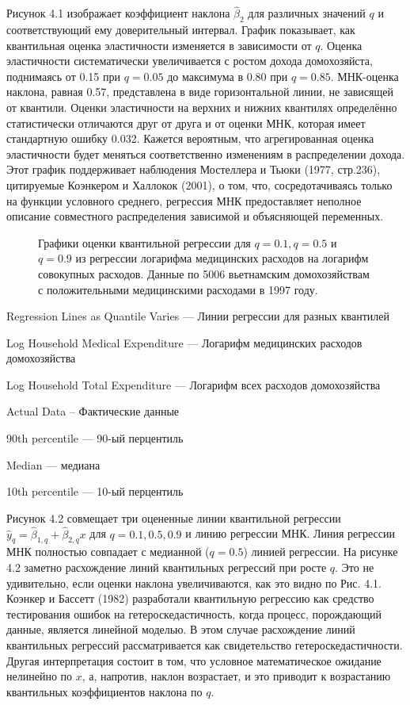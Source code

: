 Рисунок 4.1 изображает коэффициент наклона $\hat{\beta}_2$ для различных значений $q$ и соответствующий ему доверительный интервал. График показывает, как квантильная оценка эластичности изменяется в зависимости от $q$. Оценка эластичности систематически увеличивается с ростом дохода домохозяйста, поднимаясь от 0.15 при $q=0.05$ до максимума в $0.80$ при $q=0.85$. МНК-оценка наклона, равная 0.57,  представлена в виде горизонтальной линии, не зависящей от квантили. Оценки эластичности на верхних и нижних квантилях определённо статистически отличаются друг от друга и от оценки МНК, которая имеет стандартную ошибку 0.032. Кажется вероятным, что агрегированная оценка эластичности будет меняться соответственно изменениям в распределении дохода. Этот график поддерживает наблюдения Мостеллера и Тьюки (1977, стр.236), цитируемые Коэнкером и Халлокок (2001), о том, что, сосредотачиваясь только на функции условного среднего, регрессия МНК предоставляет неполное описание совместного распределения зависимой и объясняющей переменных.

\begin{figure}[t]
 \caption{Графики оценки квантильной регрессии для $q=0.1, q=0.5$ и $q=0.9$ из регрессии логарифма медицинских расходов на логарифм совокупных расходов. Данные по 5006 вьетнамским домохозяйствам с положительными медицинскими расходами в 1997 году.}
\end{figure}

Regression Lines as Quantile Varies --- Линии регрессии для разных квантилей

Log Household Medical Expenditure --- Логарифм медицинских расходов домохозяйства

Log Household Total Expenditure --- Логарифм всех расходов домохозяйства


Actual Data -- Фактические данные
 
90th percentile --- 90-ый перцентиль

Median --- медиана
 
10th percentile --- 10-ый перцентиль


Рисунок 4.2 совмещает три оцененные линии квантильной регрессии $\hat{y}_q = \hat{\beta}_{1,q}+\hat{\beta}_{2,q}x$ для $q=0.1, 0.5, 0.9$ и линию регрессии МНК. Линия регрессии МНК полностью совпадает с медианной ($q=0.5$) линией регрессии. На рисунке 4.2 заметно расхождение линий квантильных регрессий при росте $q$. Это не удивительно, если оценки наклона увеличиваются, как это видно по Рис. 4.1. Коэнкер и Бассетт (1982) разработали квантильную регрессию как средство тестирования ошибок на гетероскедастичность, когда процесс, порождающий данные, является линейной моделью. В этом случае расхождение линий квантильных регрессий рассматривается как свидетельство гетероскедастичности. Другая интерпретация состоит в том, что условное математическое ожидание нелинейно по $x$, а, напротив, наклон возрастает, и это приводит к возрастанию квантильных коэффициентов наклона по $q$.

